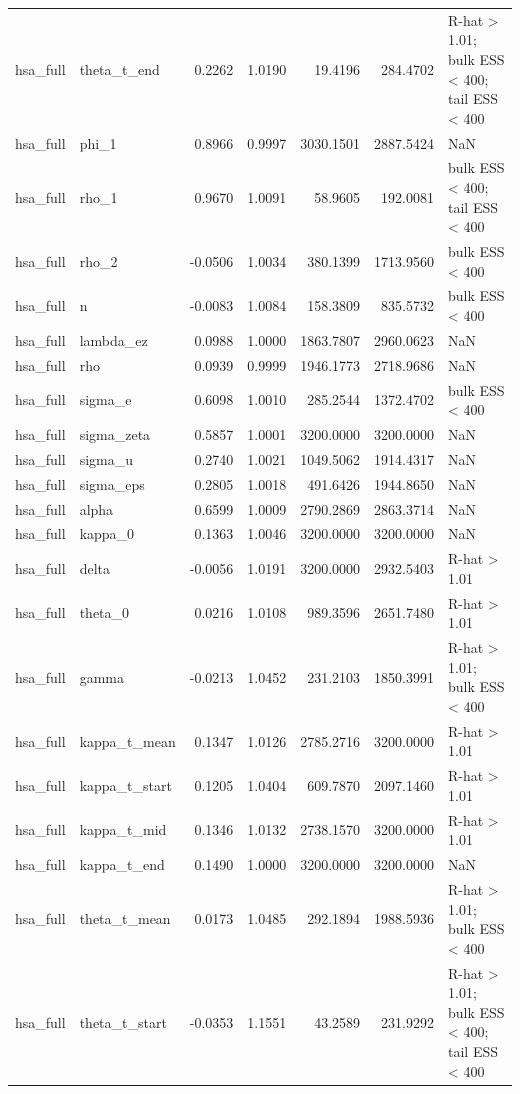 \begin{tabular}{llrrrrl}
hsa\_full & theta\_t\_end & 0.2262 & 1.0190 & 19.4196 & 284.4702 & R-hat > 1.01; bulk ESS < 400; tail ESS < 400 \\
hsa\_full & phi\_1 & 0.8966 & 0.9997 & 3030.1501 & 2887.5424 & NaN \\
hsa\_full & rho\_1 & 0.9670 & 1.0091 & 58.9605 & 192.0081 & bulk ESS < 400; tail ESS < 400 \\
hsa\_full & rho\_2 & -0.0506 & 1.0034 & 380.1399 & 1713.9560 & bulk ESS < 400 \\
hsa\_full & n & -0.0083 & 1.0084 & 158.3809 & 835.5732 & bulk ESS < 400 \\
hsa\_full & lambda\_ez & 0.0988 & 1.0000 & 1863.7807 & 2960.0623 & NaN \\
hsa\_full & rho & 0.0939 & 0.9999 & 1946.1773 & 2718.9686 & NaN \\
hsa\_full & sigma\_e & 0.6098 & 1.0010 & 285.2544 & 1372.4702 & bulk ESS < 400 \\
hsa\_full & sigma\_zeta & 0.5857 & 1.0001 & 3200.0000 & 3200.0000 & NaN \\
hsa\_full & sigma\_u & 0.2740 & 1.0021 & 1049.5062 & 1914.4317 & NaN \\
hsa\_full & sigma\_eps & 0.2805 & 1.0018 & 491.6426 & 1944.8650 & NaN \\
hsa\_full & alpha & 0.6599 & 1.0009 & 2790.2869 & 2863.3714 & NaN \\
hsa\_full & kappa\_0 & 0.1363 & 1.0046 & 3200.0000 & 3200.0000 & NaN \\
hsa\_full & delta & -0.0056 & 1.0191 & 3200.0000 & 2932.5403 & R-hat > 1.01 \\
hsa\_full & theta\_0 & 0.0216 & 1.0108 & 989.3596 & 2651.7480 & R-hat > 1.01 \\
hsa\_full & gamma & -0.0213 & 1.0452 & 231.2103 & 1850.3991 & R-hat > 1.01; bulk ESS < 400 \\
hsa\_full & kappa\_t\_mean & 0.1347 & 1.0126 & 2785.2716 & 3200.0000 & R-hat > 1.01 \\
hsa\_full & kappa\_t\_start & 0.1205 & 1.0404 & 609.7870 & 2097.1460 & R-hat > 1.01 \\
hsa\_full & kappa\_t\_mid & 0.1346 & 1.0132 & 2738.1570 & 3200.0000 & R-hat > 1.01 \\
hsa\_full & kappa\_t\_end & 0.1490 & 1.0000 & 3200.0000 & 3200.0000 & NaN \\
hsa\_full & theta\_t\_mean & 0.0173 & 1.0485 & 292.1894 & 1988.5936 & R-hat > 1.01; bulk ESS < 400 \\
hsa\_full & theta\_t\_start & -0.0353 & 1.1551 & 43.2589 & 231.9292 & R-hat > 1.01; bulk ESS < 400; tail ESS < 400 \\

\end{tabular}

